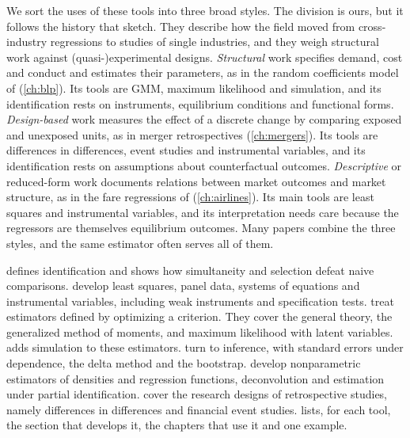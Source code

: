 We sort the uses of these tools into three broad styles. The division is ours, but it follows the history that
\citet[pp.~146--147 and 157--158]{EinavLevin2010} sketch. They describe how the field moved from cross-industry
regressions to studies of single industries, and they weigh structural work against (quasi-)experimental designs.
\emph{Structural}
work specifies demand, cost and conduct and estimates their parameters, as in the random coefficients model of
\citet{BerryLevinsohnPakes1995} (\cref{ch:blp}). Its tools are GMM, maximum likelihood and simulation, and its
identification rests on instruments, equilibrium conditions and functional forms. \emph{Design-based} work measures
the effect of a discrete change by comparing exposed and unexposed units, as in merger retrospectives
(\cref{ch:mergers}). Its tools are differences in differences, event studies and instrumental variables, and its
identification rests on assumptions about counterfactual outcomes. \emph{Descriptive} or reduced-form work documents
relations between market outcomes and market structure, as in the fare regressions of \citet{Borenstein1989}
(\cref{ch:airlines}). Its main tools are least squares and instrumental variables, and its interpretation needs care
because the regressors are themselves equilibrium outcomes. Many papers combine the three styles, and the same
estimator often serves all of them.

 defines identification and shows how simultaneity and selection defeat naive
comparisons.  develop least squares, panel data, systems of equations and instrumental
variables, including weak instruments and specification tests.  treat
estimators defined by optimizing a criterion. They cover the general theory, the generalized method of moments, and
maximum likelihood with latent variables.  adds simulation to these estimators.
 turn to inference, with standard errors under dependence, the delta method and the
bootstrap.  develop nonparametric estimators of densities and regression functions,
deconvolution and estimation under partial identification.  cover the research
designs of retrospective studies, namely differences in differences and financial event studies. 
lists, for each tool, the section that develops it, the chapters that use it and one example.

